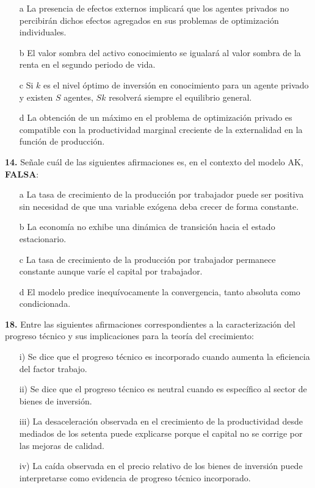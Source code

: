 \documentclass{nuevotema}
\begin{document}
\begin{itemize}
    \item[a] La presencia de efectos externos implicará que los agentes privados no percibirán dichos efectos agregados en sus problemas de optimización individuales.
    \item[b] El valor sombra del activo conocimiento se igualará al valor sombra de la renta en el segundo periodo de vida. 
    \item[c] Si $k$ es el nivel óptimo de inversión en conocimiento para un agente privado y existen $S$ agentes, $Sk$ resolverá siempre el equilibrio general.
    \item[d] La obtención de un máximo en el problema de optimización privado es compatible con la productividad marginal creciente de la externalidad en la función de producción.
\end{itemize}

\textbf{14.} Señale cuál de las siguientes afirmaciones es, en el contexto del modelo AK, \textbf{FALSA}:
\begin{itemize}
	\item[a] La tasa de crecimiento de la producción por trabajador puede ser positiva sin necesidad de que una variable exógena deba crecer de forma constante.
	\item[b] La economía no exhibe una dinámica de transición hacia el estado estacionario.
	\item[c] La tasa de crecimiento de la producción por trabajador permanece constante aunque varíe el capital por trabajador.
	\item[d] El modelo predice inequívocamente la convergencia, tanto absoluta como condicionada.
\end{itemize}

\textbf{18.} Entre las siguientes afirmaciones correspondientes a la caracterización del progreso técnico y sus implicaciones para la teoría del crecimiento:

\begin{itemize}
	\item[i)] Se dice que el progreso técnico es incorporado cuando aumenta la eficiencia del factor trabajo.
	\item[ii)] Se dice que el progreso técnico es neutral cuando es específico al sector de bienes de inversión.
	\item[iii)] La desaceleración observada en el crecimiento de la productividad desde mediados de los setenta puede explicarse porque el capital no se corrige por las mejoras de calidad.
	\item[iv)] La caída observada en el precio relativo de los bienes de inversión puede interpretarse como evidencia de progreso técnico incorporado.
\end{itemize}
\end{document}
